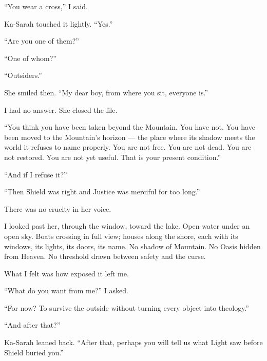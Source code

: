 ``You wear a cross,'' I said.\par

Ka-Sarah touched it lightly. ``Yes.''\par

``Are you one of them?''\par

``One of whom?''\par

``Outsiders.''\par

She smiled then. ``My dear boy, from where you sit, everyone is.''\par

I had no answer. She closed the file.\par

``You think you have been taken beyond the Mountain. You have not. You have been moved to the Mountain's horizon --- the place where its shadow meets the world it refuses to name properly. You are not free. You are not dead. You are not restored. You are not yet useful. That is your present condition.''\par

``And if I refuse it?''\par

``Then Shield was right and Justice was merciful for too long.''\par

There was no cruelty in her voice.\par

I looked past her, through the window, toward the lake. Open water under an open sky. Boats crossing in full view; houses along the shore, each with its windows, its lights, its doors, its name. No shadow of Mountain. No Oasis hidden from Heaven. No threshold drawn between safety and the curse.\par

What I felt was how exposed it left me.\par

``What do you want from me?'' I asked.\par

``For now? To survive the outside without turning every object into theology.''\par

``And after that?''\par

Ka-Sarah leaned back. ``After that, perhaps you will tell us what Light saw before Shield buried you.''\par

